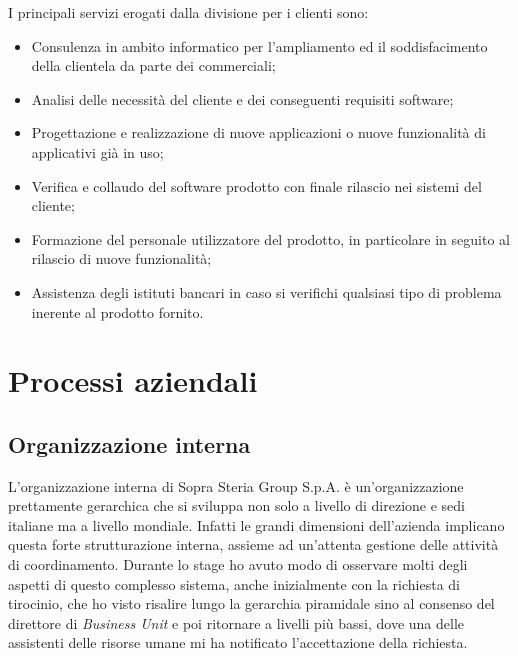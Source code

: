 	
	I principali servizi erogati dalla divisione per i clienti sono:
	
	\begin{itemize}
		\item Consulenza in ambito informatico per l'ampliamento ed il soddisfacimento della clientela da parte dei commerciali;
		\item Analisi delle necessità del cliente e dei conseguenti requisiti software;
		\item Progettazione e realizzazione di nuove applicazioni o nuove funzionalità di applicativi già in uso;
		\item Verifica e collaudo del software prodotto con finale rilascio nei sistemi del cliente;
		\item Formazione del personale utilizzatore del prodotto, in particolare in seguito al rilascio di nuove funzionalità;
		\item Assistenza degli istituti bancari in caso si verifichi qualsiasi tipo di problema inerente al prodotto fornito.
	\end{itemize}	 

\section{Processi aziendali}

	\subsection{Organizzazione interna}
	
	L'organizzazione interna di Sopra Steria Group S.p.A. è un'organizzazione prettamente gerarchica	 che si sviluppa non solo a livello di direzione e sedi italiane ma a livello mondiale. Infatti le grandi dimensioni dell'azienda implicano questa forte strutturazione interna, assieme ad un'attenta gestione delle attività di coordinamento. Durante lo stage ho avuto modo di osservare molti degli aspetti di questo complesso sistema, anche inizialmente con la richiesta di tirocinio, che ho visto risalire lungo la gerarchia piramidale sino al consenso del direttore di \textit{Business Unit} e poi ritornare a livelli più bassi, dove una delle assistenti delle risorse umane mi ha notificato l'accettazione della richiesta.\\
	
